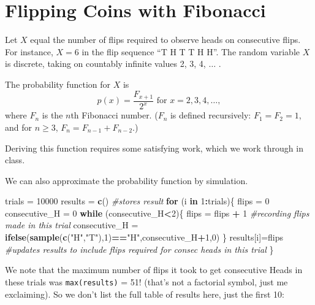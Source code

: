 \documentclass[
]{book}
\newenvironment{Shaded}{\begin{snugshade}}{\end{snugshade}}
\newcommand{\CommentTok}[1]{\textcolor[rgb]{0.56,0.35,0.01}{\textit{#1}}}
\newcommand{\ControlFlowTok}[1]{\textcolor[rgb]{0.13,0.29,0.53}{\textbf{#1}}}
\newcommand{\DecValTok}[1]{\textcolor[rgb]{0.00,0.00,0.81}{#1}}
\newcommand{\FunctionTok}[1]{\textcolor[rgb]{0.13,0.29,0.53}{\textbf{#1}}}
\newcommand{\NormalTok}[1]{#1}
\newcommand{\OtherTok}[1]{\textcolor[rgb]{0.56,0.35,0.01}{#1}}
\newcommand{\SpecialCharTok}[1]{\textcolor[rgb]{0.81,0.36,0.00}{\textbf{#1}}}
\newcommand{\StringTok}[1]{\textcolor[rgb]{0.31,0.60,0.02}{#1}}
\theoremstyle{definition}
\theoremstyle{definition}
\theoremstyle{definition}
\theoremstyle{definition}
\theoremstyle{remark}
\begin{document}
\section{Flipping Coins with Fibonacci}\label{flipping-coins-with-fibonacci}

Let \(X\) equal the number of flips required to observe heads on consecutive flips. For instance, \(X = 6\) in the flip sequence ``T H T T H H''. The random variable \(X\) is discrete, taking on countably infinite values 2, 3, 4, \(\ldots\) .

The probability function for \(X\) is \[p(x) = \frac{F_{x+1}}{2^x} \text{     for } x = 2, 3, 4, \ldots,\] where \(F_n\) is the \(n\)th Fibonacci number. (\(F_n\) is defined recursively: \(F_1 = F_2 = 1\), and for \(n \geq 3\), \(F_n = F_{n-1}+F_{n-2}\).)

Deriving this function requires some satisfying work, which we work through in class.

We can also approximate the probability function by simulation.

\begin{Shaded}
\begin{Highlighting}[]
\NormalTok{trials }\OtherTok{=} \DecValTok{10000}
\NormalTok{results }\OtherTok{=} \FunctionTok{c}\NormalTok{() }\CommentTok{\#stores result}
\ControlFlowTok{for}\NormalTok{ (i }\ControlFlowTok{in} \DecValTok{1}\SpecialCharTok{:}\NormalTok{trials)\{}
\NormalTok{  flips }\OtherTok{=} \DecValTok{0}
\NormalTok{  consecutive\_H }\OtherTok{=} \DecValTok{0}
  \ControlFlowTok{while}\NormalTok{ (consecutive\_H}\SpecialCharTok{\textless{}}\DecValTok{2}\NormalTok{)\{}
\NormalTok{    flips }\OtherTok{=}\NormalTok{ flips }\SpecialCharTok{+} \DecValTok{1} \CommentTok{\#recording flips made in this trial}
\NormalTok{    consecutive\_H }\OtherTok{=} \FunctionTok{ifelse}\NormalTok{(}\FunctionTok{sample}\NormalTok{(}\FunctionTok{c}\NormalTok{(}\StringTok{"H"}\NormalTok{,}\StringTok{"T"}\NormalTok{),}\DecValTok{1}\NormalTok{)}\SpecialCharTok{==}\StringTok{"H"}\NormalTok{,consecutive\_H}\SpecialCharTok{+}\DecValTok{1}\NormalTok{,}\DecValTok{0}\NormalTok{)}
\NormalTok{  \}}
\NormalTok{  results[i]}\OtherTok{=}\NormalTok{flips }\CommentTok{\#updates results to include flips required for consec heads in this trial}
\NormalTok{\}}
\end{Highlighting}
\end{Shaded}

We note that the maximum number of flips it took to get consecutive Heads in these trials was \texttt{max(results)} = 51! (that's not a factorial symbol, just me exclaiming). So we don't list the full table of results here, just the first 10:
\end{document}
